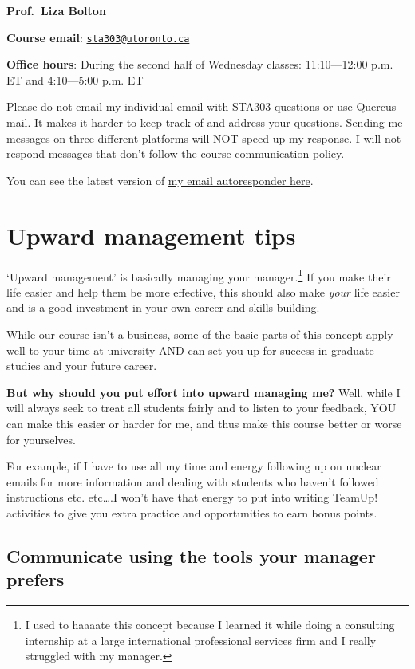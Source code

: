 \documentclass[
  openany]{book}
\begin{document}
\textbf{Prof.~Liza Bolton}

\textbf{Course email}: \href{mailto:sta303@utoronto.ca}{\nolinkurl{sta303@utoronto.ca}}

\textbf{Office hours}: During the second half of Wednesday classes: 11:10---12:00 p.m. ET and 4:10---5:00 p.m. ET

Please do not email my individual email with STA303 questions or use Quercus mail. It makes it harder to keep track of and address your questions. Sending me messages on three different platforms will NOT speed up my response. I will not respond messages that don't follow the course communication policy.

You can see the latest version of \href{https://www.lizabolton.com/autoresponder.html}{my email autoresponder here}.

\hypertarget{upward-management-tips}{%
\section{Upward management tips}\label{upward-management-tips}}

`Upward management' is basically managing your manager.\footnote{I used to haaaate this concept because I learned it while doing a consulting internship at a large international professional services firm and I really struggled with my manager.} If you make their life easier and help them be more effective, this should also make \emph{your} life easier and is a good investment in your own career and skills building.

While our course isn't a business, some of the basic parts of this concept apply well to your time at university AND can set you up for success in graduate studies and your future career.

\textbf{But why should you put effort into upward managing me?} Well, while I will always seek to treat all students fairly and to listen to your feedback, YOU can make this easier or harder for me, and thus make this course better or worse for yourselves.

For example, if I have to use all my time and energy following up on unclear emails for more information and dealing with students who haven't followed instructions etc. etc\ldots.I won't have that energy to put into writing TeamUp! activities to give you extra practice and opportunities to earn bonus points.

\hypertarget{communicate-using-the-tools-your-manager-prefers}{%
\subsection{Communicate using the tools your manager prefers}\label{communicate-using-the-tools-your-manager-prefers}}
\end{document}
